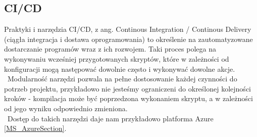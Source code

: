 \subsection{CI/CD}

Praktyki i narzędzia CI/CD, z ang. Continous Integration / Continous Delivery 
(ciągła integracja i dostawa oprogramowania) to określenie na zautomatyzowane
dostarczanie programów wraz z ich rozwojem. Taki proces polega na wykonywaniu 
wcześniej przygotowanych skryptów, które w zależności od konfiguracji mogą 
następować dowolnie często i wykonywać dowolne akcje. \\\
Modularność narzędzi pozwala na pełne dostosowanie każdej czynności do potrzeb projektu, 
przykładowo nie jesteśmy ograniczeni do określonej kolejności kroków - kompilacja
może być poprzedzona wykonaniem skryptu, a w zależności od jego wyniku odpowiednio zmieniona. \\\
Dostęp do takich narzędzi daje nam przykładowo platforma Azure \ref{MS_AzureSection}.